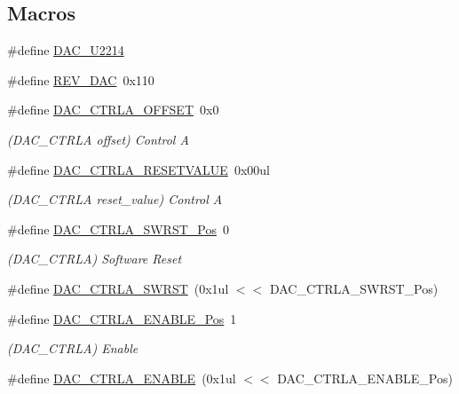 \subsection*{Macros}
\begin{DoxyCompactItemize}
\item 
\#define \mbox{\hyperlink{group___s_a_m_d21___d_a_c_gab76e3488c106c6d2688d864117555e6d}{D\+A\+C\+\_\+\+U2214}}
\item 
\#define \mbox{\hyperlink{group___s_a_m_d21___d_a_c_ga49409e81a9642d61cb82d3f664c44844}{R\+E\+V\+\_\+\+D\+AC}}~0x110
\item 
\#define \mbox{\hyperlink{group___s_a_m_d21___d_a_c_gaebd4a25fcf855e7d3824acf7f9d3ac83}{D\+A\+C\+\_\+\+C\+T\+R\+L\+A\+\_\+\+O\+F\+F\+S\+ET}}~0x0
\begin{DoxyCompactList}\small\item\em (D\+A\+C\+\_\+\+C\+T\+R\+LA offset) Control A \end{DoxyCompactList}\item 
\#define \mbox{\hyperlink{group___s_a_m_d21___d_a_c_ga5b2a0ad82560fded073e6276046facfc}{D\+A\+C\+\_\+\+C\+T\+R\+L\+A\+\_\+\+R\+E\+S\+E\+T\+V\+A\+L\+UE}}~0x00ul
\begin{DoxyCompactList}\small\item\em (D\+A\+C\+\_\+\+C\+T\+R\+LA reset\+\_\+value) Control A \end{DoxyCompactList}\item 
\#define \mbox{\hyperlink{group___s_a_m_d21___d_a_c_gafa3f0f563ba0dcc229026ca6d3effdcc}{D\+A\+C\+\_\+\+C\+T\+R\+L\+A\+\_\+\+S\+W\+R\+S\+T\+\_\+\+Pos}}~0
\begin{DoxyCompactList}\small\item\em (D\+A\+C\+\_\+\+C\+T\+R\+LA) Software Reset \end{DoxyCompactList}\item 
\#define \mbox{\hyperlink{group___s_a_m_d21___d_a_c_gab50aae3a8aa2d5bcfb9892d87f425fd8}{D\+A\+C\+\_\+\+C\+T\+R\+L\+A\+\_\+\+S\+W\+R\+ST}}~(0x1ul $<$$<$ D\+A\+C\+\_\+\+C\+T\+R\+L\+A\+\_\+\+S\+W\+R\+S\+T\+\_\+\+Pos)
\item 
\#define \mbox{\hyperlink{group___s_a_m_d21___d_a_c_gafa6e69ab386a0acc15ec18b0584091f9}{D\+A\+C\+\_\+\+C\+T\+R\+L\+A\+\_\+\+E\+N\+A\+B\+L\+E\+\_\+\+Pos}}~1
\begin{DoxyCompactList}\small\item\em (D\+A\+C\+\_\+\+C\+T\+R\+LA) Enable \end{DoxyCompactList}\item 
\#define \mbox{\hyperlink{group___s_a_m_d21___d_a_c_gabdbf590aa240a8a85a49f13e27872353}{D\+A\+C\+\_\+\+C\+T\+R\+L\+A\+\_\+\+E\+N\+A\+B\+LE}}~(0x1ul $<$$<$ D\+A\+C\+\_\+\+C\+T\+R\+L\+A\+\_\+\+E\+N\+A\+B\+L\+E\+\_\+\+Pos)

\end{DoxyCompactItemize}
